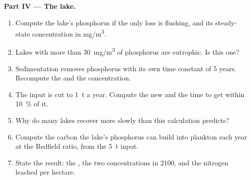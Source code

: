 \begin{problem}
\medskip
\noindent\textbf{Part IV --- The lake.}
\begin{enumerate}[resume]
  \item Compute the lake's phosphorus  if the only
        loss is flushing, and its steady-state concentration in
        \unit{mg/m^3}.
  \item Lakes with more than \qty{30}{mg/m^3} of phosphorus are
        eutrophic. Is this one?
  \item Sedimentation removes phosphorus with its own time constant
        of 5 years. Recompute the  and the
        concentration.
  \item The input is cut to \qty{1}{t} a year. Compute the new
         and the time to get within \qty{10}{\%} of it.
  \item Why do many lakes recover more slowly than this calculation
        predicts?
  \item Compute the carbon the lake's phosphorus can build into
        plankton each year at the Redfield ratio, from the
        \qty{5}{t} input.
  \item State the result: the , the two
        concentrations in 2100, and the nitrogen leached per
        hectare.
\end{enumerate}
\end{problem}
